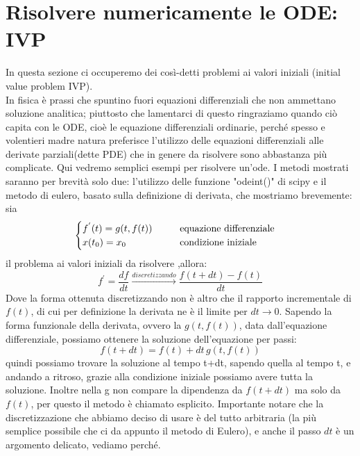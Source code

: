 \documentclass[10pt,a4paper]{article}
\begin{document}
\section{Risolvere numericamente le ODE: IVP}
In questa sezione ci occuperemo dei così-detti problemi ai valori iniziali (initial value problem IVP).\\
In fisica è prassi che spuntino fuori equazioni differenziali che non ammettano soluzione analitica; piuttosto che lamentarci di questo ringraziamo quando ciò capita con le ODE, cioè le equazione differenziali ordinarie, perché spesso e volentieri madre natura preferisce l'utilizzo delle equazioni differenziali alle derivate parziali(dette PDE) che in genere da risolvere sono abbastanza più complicate. Qui vedremo semplici esempi per risolvere un'ode.
I metodi mostrati saranno per brevità solo due: l'utilizzo delle funzione "odeint()" di scipy e il metodo di eulero, basato sulla definizione di derivata, che mostriamo brevemente:
sia 
\begin{equation}
\begin{cases}
f^{'}(t)=g(t, f(t))	 \hspace{10 mm} \text{equazione differenziale}\\
x(t_0) = x_0 \hspace{19.5 mm} \text{condizione iniziale}
\end{cases}
\end{equation}
il problema ai valori iniziali da risolvere ,allora:
\begin{equation}
f^{'}=\frac{df}{dt} \xrightarrow{discretizzando} \frac{f(t+dt)-f(t)}{dt}
\end{equation}
Dove la forma ottenuta discretizzando non è altro che il rapporto incrementale di $f(t)$, di cui per definizione la derivata ne è il limite per $dt \to 0$.  Sapendo la forma funzionale della derivata, ovvero la $g(t, f(t))$, data dall'equazione differenziale, possiamo ottenere la soluzione dell'equazione per passi:
\begin{equation}
f(t+dt) = f(t) + dt \, g(t, f(t))
\end{equation}
quindi possiamo trovare la soluzione al tempo t+dt, sapendo quella al tempo t, e andando a ritroso, grazie alla condizione iniziale possiamo avere tutta la soluzione. Inoltre nella g non compare la dipendenza da $f(t+dt)$ ma solo da $f(t)$, per questo il metodo è chiamato esplicito. Importante notare che la discretizzazione che abbiamo deciso di usare è del tutto arbitraria (la più semplice possibile che ci da appunto il metodo di Eulero), e anche il passo $dt$ è un argomento delicato, vediamo perché.
\end{document}
